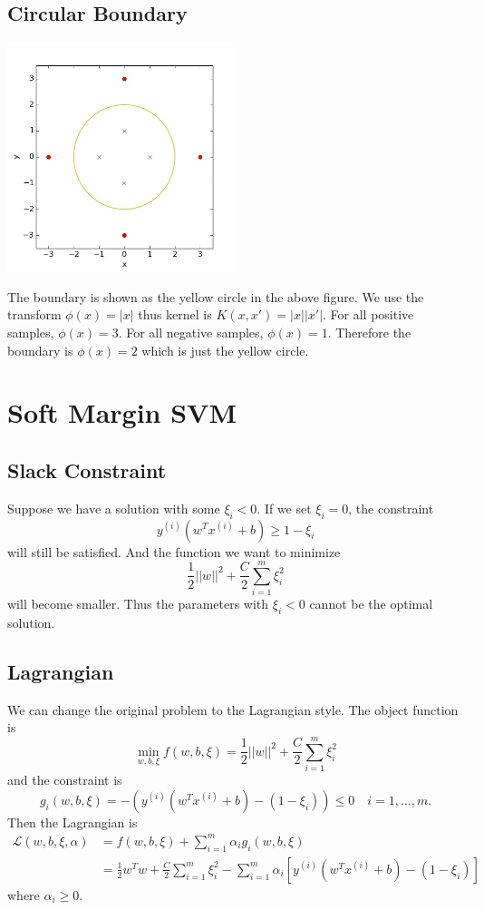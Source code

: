 \documentclass{article}
\begin{document}
\subsection{Circular Boundary}
\begin{center}
\includegraphics[width=0.5\textwidth]{../result/circular_boundary.jpg}
\end{center}
The boundary is shown as the yellow circle in the above figure. We use the transform $\phi(x)=|x|$ thus kernel is $K(x,x')=|x||x'|$. For all positive samples, $\phi(x)=3$. For all negative samples, $\phi(x)=1$. Therefore the boundary is $\phi(x)=2$ which is just the yellow circle.

\section{Soft Margin SVM}

\subsection{Slack Constraint}
Suppose we have a solution with some $\xi_i<0$. If we set $\xi_i=0$, the constraint $$y^{(i)}(w^Tx^{(i)}+b)\ge1-\xi_i$$ will still be satisfied. And the function we want to minimize $$\frac{1}{2}||w||^2+\frac{C}{2}\sum_{i=1}^m\xi_i^2$$ will become smaller. Thus the parameters with $\xi_i<0$ cannot be the optimal solution.

\subsection{Lagrangian}
We can change the original problem to the Lagrangian style. The object function is $$\min_{w,b,\xi}f(w,b,\xi)= \frac{1}{2}||w||^2+\frac{C}{2}\sum_{i=1}^m\xi_i^2$$ and the constraint is $$g_i(w,b,\xi)=-(y^{(i)}(w^Tx^{(i)}+b)-(1-\xi_i)) \le0\quad i=1,\ldots,m.$$ Then the Lagrangian is
\begin{align*}
\mathcal{L}(w,b,\xi,\alpha)&=f(w,b,\xi)+ \sum_{i=1}^m\alpha_ig_i(w,b,\xi) \\
&=\frac{1}{2}w^Tw+\frac{C}{2}\sum_{i=1}^m\xi_i^2 -\sum_{i=1}^m\alpha_i[y^{(i)}(w^Tx^{(i)}+b)-(1-\xi_i)]
\end{align*}
where $\alpha_i\ge0$.
\end{document}
